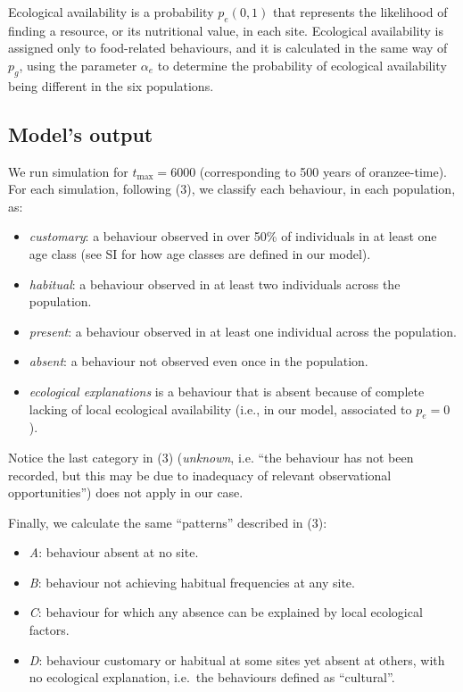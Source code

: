 \documentclass[9pt,twocolumn,twoside,]{pnas-new}
\begin{document}
Ecological availability is a probability \(p_e(0,1)\) that represents
the likelihood of finding a resource, or its nutritional value, in each
site. Ecological availability is assigned only to food-related
behaviours, and it is calculated in the same way of \(p_g\), using the
parameter \(\alpha_e\) to determine the probability of ecological
availability being different in the six populations.

\subsection*{Model's output}\label{format}

We run simulation for \(t_\text{max}=6000\) (corresponding to 500 years
of oranzee-time). For each simulation, following (3), we classify each
behaviour, in each population, as:

\begin{itemize}
\item
  \emph{customary}: a behaviour observed in over 50\% of individuals in
  at least one age class (see SI for how age classes are defined in our
  model).
\item
  \emph{habitual}: a behaviour observed in at least two individuals
  across the population.
\item
  \emph{present}: a behaviour observed in at least one individual across
  the population.
\item
  \emph{absent}: a behaviour not observed even once in the population.
\item
  \emph{ecological explanations} is a behaviour that is absent because
  of complete lacking of local ecological availability (i.e., in our
  model, associated to \(p_e=0\)).
\end{itemize}

Notice the last category in (3) (\emph{unknown}, i.e. ``the behaviour
has not been recorded, but this may be due to inadequacy of relevant
observational opportunities'') does not apply in our case.

Finally, we calculate the same ``patterns'' described in (3):

\begin{itemize}
\item
  \emph{A}: behaviour absent at no site.
\item
  \emph{B}: behaviour not achieving habitual frequencies at any site.
\item
  \emph{C}: behaviour for which any absence can be explained by local
  ecological factors.
\item
  \emph{D}: behaviour customary or habitual at some sites yet absent at
  others, with no ecological explanation, i.e.~the behaviours defined as
  ``cultural''.
\end{itemize}
\end{document}
